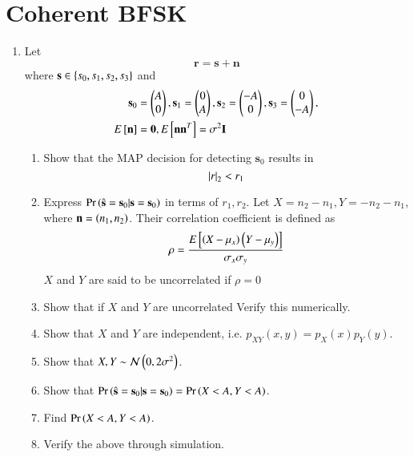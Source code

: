 \documentclass[journal,12pt,twocolumn]{IEEEtran}
\renewcommand\thesection{\arabic{section}}
\begin{document}
\section{Coherent BFSK}
\begin{enumerate}[label=\thesection.\arabic*
,ref=\thesection.\theenumi]

\item
Let
\begin{equation}
\mathbf{r} = \mathbf{s}+ \mathbf{n}
\end{equation}
where $\mathbf{s} \in \left\{s_0,s_1,s_2, s_3\right\}$ and
\begin{align}
\mathbf{s}_0 &= 
\begin{pmatrix*}
A\\
0
\end{pmatrix*},
\mathbf{s}_1 = 
\begin{pmatrix*}
0\\
A
\end{pmatrix*},
\mathbf{s}_2 = 
\begin{pmatrix*}
-A\\
0
\end{pmatrix*},
\mathbf{s}_3 = 
\begin{pmatrix*}
0\\
-A
\end{pmatrix*},
\\
E\sbrak{\mathbf{n}} &= \mathbf{0}, E\sbrak{\mathbf{n}\mathbf{n}^T} = \sigma^2 \mathbf{I}
\end{align}
%
\begin{enumerate}
\item Show that the MAP decision for detecting $\mathbf{s}_0$ results in
\begin{equation}
\left\vert r\right\vert_2 < r_1
\end{equation}
\item Express $\Pr\left(\hat{\mathbf{s}} = \mathbf{s}_0|\mathbf{s} = \mathbf{s}_0\right)$ in terms of $r_1, r_2$.
Let $X=n_2-n_1, Y = -n_2-n_1$, where $\mathbf{n}=\left(n_1,n_2\right)$.
Their correlation coefficient is defined as
%
\begin{align}
\rho = \frac{E{}\left[\left(X-\mu_x\right)\left(Y-\mu_y\right)\right]}{\sigma_x\sigma_y}
\end{align}
%
$X$ and $Y$ are said to be uncorrelated if $\rho = 0$
\item Show that if $X$ and $Y$ are uncorrelated 
Verify this numerically.
\item Show that $X$ and $Y$ are independent, i.e. $p_{XY}(x,y) = p_{X}(x)p_{Y}(y)$.
\item Show that $X,Y \sim \mathcal{N}\left(0,2\sigma^2\right)$.
\item Show that $\Pr\left(\hat{\mathbf{s}} = \mathbf{s}_0|\mathbf{s} = \mathbf{s}_0\right) =\Pr\left( X < A,  Y < A\right)$.
\item Find $\Pr\left( X < A,  Y < A\right)$.
\item Verify the above through simulation.
\end{enumerate}

\end{enumerate}
\end{document}
